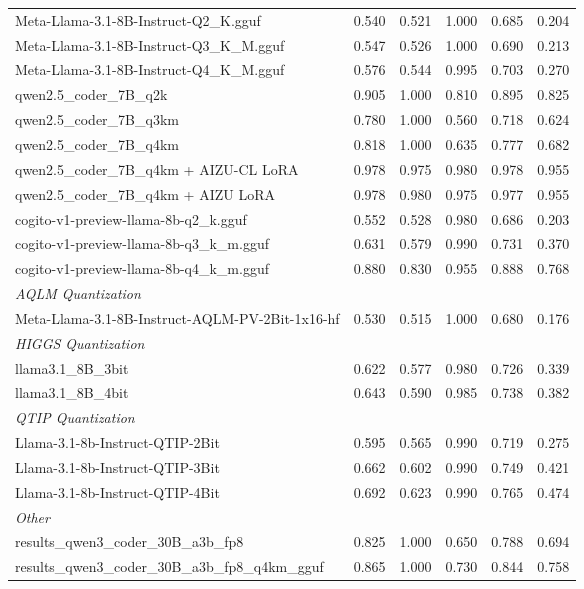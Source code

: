 \begin{table}[htbp]
{\begin{tabular}{lrrrrr}
    Meta-Llama-3.1-8B-Instruct-Q2\_K.gguf & 0.540 & 0.521 & 1.000 & 0.685 & 0.204 \\
    Meta-Llama-3.1-8B-Instruct-Q3\_K\_M.gguf & 0.547 & 0.526 & 1.000 & 0.690 & 0.213 \\
    Meta-Llama-3.1-8B-Instruct-Q4\_K\_M.gguf & 0.576 & 0.544 & 0.995 & 0.703 & 0.270 \\
    qwen2.5\_coder\_7B\_q2k & 0.905 & 1.000 & 0.810 & 0.895 & 0.825 \\
    qwen2.5\_coder\_7B\_q3km & 0.780 & 1.000 & 0.560 & 0.718 & 0.624 \\
    qwen2.5\_coder\_7B\_q4km & 0.818 & 1.000 & 0.635 & 0.777 & 0.682 \\
    qwen2.5\_coder\_7B\_q4km + AIZU-CL LoRA & 0.978 & 0.975 & 0.980 & 0.978 & \cellcolor{green!50}0.955 \\
    qwen2.5\_coder\_7B\_q4km + AIZU LoRA & 0.978 & 0.980 & 0.975 & 0.977 & \cellcolor{green!40}0.955 \\
    cogito-v1-preview-llama-8b-q2\_k.gguf & 0.552 & 0.528 & 0.980 & 0.686 & 0.203 \\
    cogito-v1-preview-llama-8b-q3\_k\_m.gguf & 0.631 & 0.579 & 0.990 & 0.731 & 0.370 \\
    cogito-v1-preview-llama-8b-q4\_k\_m.gguf & 0.880 & 0.830 & 0.955 & 0.888 & 0.768 \\
    \midrule
    \multicolumn{6}{l}{\textit{AQLM Quantization}} \\
    \midrule
    Meta-Llama-3.1-8B-Instruct-AQLM-PV-2Bit-1x16-hf & 0.530 & 0.515 & 1.000 & 0.680 & 0.176 \\
    \midrule
    \multicolumn{6}{l}{\textit{HIGGS Quantization}} \\
    \midrule
    llama3.1\_8B\_3bit & 0.622 & 0.577 & 0.980 & 0.726 & 0.339 \\
    llama3.1\_8B\_4bit & 0.643 & 0.590 & 0.985 & 0.738 & 0.382 \\
    \midrule
    \multicolumn{6}{l}{\textit{QTIP Quantization}} \\
    \midrule
    Llama-3.1-8b-Instruct-QTIP-2Bit & 0.595 & 0.565 & 0.990 & 0.719 & 0.275 \\
    Llama-3.1-8b-Instruct-QTIP-3Bit & 0.662 & 0.602 & 0.990 & 0.749 & 0.421 \\
    Llama-3.1-8b-Instruct-QTIP-4Bit & 0.692 & 0.623 & 0.990 & 0.765 & 0.474 \\
    \midrule
    \multicolumn{6}{l}{\textit{Other}} \\
    \midrule
    results\_qwen3\_coder\_30B\_a3b\_fp8 & 0.825 & 1.000 & 0.650 & 0.788 & 0.694 \\
    results\_qwen3\_coder\_30B\_a3b\_fp8\_q4km\_gguf & 0.865 & 1.000 & 0.730 & 0.844 & 0.758 \\
    \bottomrule
  \end{tabular}
  }
\end{table}

